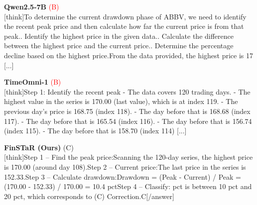 \noindent
\begin{minipage}[t]{0.28\textwidth}
\colorbox{red!8}{\parbox{\dimexpr\textwidth-2\fboxsep}{
\textbf{Qwen2.5-7B} \textcolor{red}{(B)} \\[2pt]
\tiny
[think]\newline To determine the current drawdown phase of ABBV, we need to identify the recent peak price and then calculate how far the current price is from that peak.. Identify the highest price in the given data.. Calculate the difference between the highest price and the current price.. Determine the percentage decline based on the highest price.\newline From the data provided, the highest price is 17 [...]
}}
\end{minipage}
\hfill
\begin{minipage}[t]{0.28\textwidth}
\colorbox{red!8}{\parbox{\dimexpr\textwidth-2\fboxsep}{
\textbf{TimeOmni-1} \textcolor{red}{(B)} \\[2pt]
\tiny
[think]\newline Step 1: Identify the recent peak  \newline - The data covers 120 trading days.  \newline - The highest value in the series is 170.00 (last value), which is at index 119.  \newline - The previous day's price is 168.75 (index 118).  \newline - The day before that is 168.68 (index 117).  \newline - The day before that is 165.54 (index 116).  \newline - The day before that is 156.74 (index 115).  \newline - The day before that is 158.70 (index 114) [...]
}}
\end{minipage}
\hfill
\begin{minipage}[t]{0.41\textwidth}
\colorbox{green!10}{\parbox{\dimexpr\textwidth-2\fboxsep}{
\textbf{FinSTaR (Ours)} \textcolor{green!50!black}{(C)} \\[2pt]
\tiny
[think]\newline Step 1 -- Find the peak price:\newline Scanning the 120-day series, the highest price is 170.00 (around day 108).\newline Step 2 -- Current price:\newline The last price in the series is 152.33.\newline Step 3 -- Calculate drawdown:\newline Drawdown = (Peak - Current) / Peak = (170.00 - 152.33) / 170.00 = 10.4 pct\newline Step 4 -- Classify: pct is between 10 pct and 20 pct, which corresponds to (C) Correction.\newline [/think]\newline [answer]C[/answer]
}}
\end{minipage}
\vspace{8pt}


